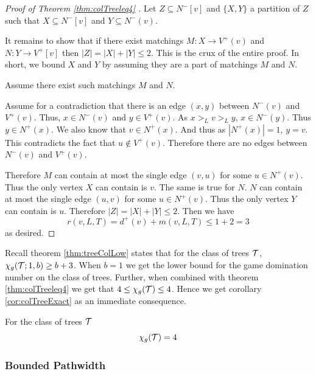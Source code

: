 \begin{proof}[Proof of Theorem \ref{thm:colTreeleq4} \cite{KIERSTEAD2000}]
    Let $Z\subseteq N^-[v]$ and $\{X,Y\}$ a partition of $Z$ such that $X\subseteq N^-[v]$ and $Y\subseteq N^-(v)$. 
    
    It remains to show that if there exist matchings $M:X\to V^+(v)$ and $N:Y\to V^+[v]$ then $|Z| = |X|+|Y| \leq 2$. This is the crux of the entire proof. In short, we bound $X$ and $Y$ by assuming they are a part of matchings $M$ and $N$.
    
    Assume there exist such matchings $M$ and $N$. 
    
    Assume for a contradiction that there is an edge $(x,y)$ between $N^-(v)$ and $V^+(v)$. Thus, $x\in N^-(v)$ and $y\in V^+(v)$. As $x >_L v >_L y$, $x \in N^-(y)$. Thus $y\in N^+(x)$. We also know that $v\in N^+(x)$. And thus as $|N^+(x)|=1$, $y=v$. This contradicts the fact that $u\notin V^+(v)$. Therefore there are no edges between $N^-(v)$ and $V^+(v)$.
    
    Therefore $M$ can contain at most the single edge $(v,u)$ for some $u\in N^+(v)$. Thus the only vertex $X$ can contain is $v$.    
    The same is true for $N$. $N$ can contain at most the single edge $(u,v)$ for some $u\in N^+(v)$. Thus the only vertex $Y$ can contain is $u$. Therefore $|Z| = |X|+|Y|\leq 2$.    
    Then we have \[r(v,L,T) = d^+(v)+m(v,L,T) \leq 1 + 2 =3\] as desired.
\end{proof}

Recall theorem \ref{thm:treeColLow} states that for the class of trees $\mathcal{T}$, $\chi_g(\mathcal{T};1,b) \geq b+3 $. When $b=1$ we get the lower bound for the game domination number on the class of trees. Further, when combined with theorem \ref{thm:colTreeleq4} we get that $4 \leq \chi_g(\mathcal{T}) \leq 4$. Hence we get corollary \ref{cor:colTreeExact} as an immediate consequence.  

\begin{corollary} \label{cor:colTreeExact}
    For the class of trees $\mathcal{T}$ \[\chi_g(\mathcal{T}) = 4\]
\end{corollary}

\subsubsection{Bounded Pathwidth}


